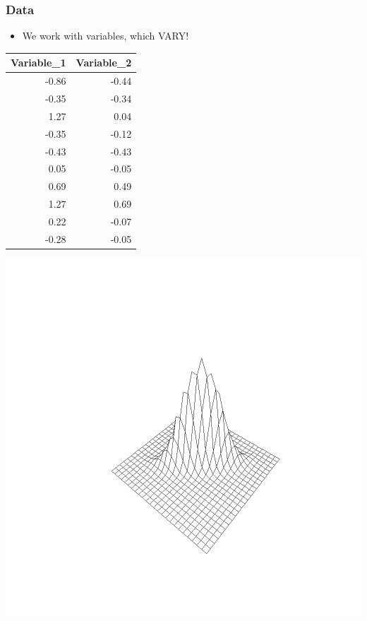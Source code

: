 \documentclass[xcolor=x11names,compress]{beamer}\usepackage[]{graphicx}\usepackage[]{color}
\makeatletter
\def\maxwidth{ %
  \ifdim\Gin@nat@width>\linewidth
    \linewidth
  \else
    \Gin@nat@width
  \fi
}
\newenvironment{knitrout}{}{} %
\renewcommand{\(}{\begin{columns}}
\renewcommand{\)}{\end{columns}}
\newcommand{\<}[1]{\begin{column}{#1}}
\renewcommand{\>}{\end{column}}
\makeatother
\begin{document}
\begin{frame}
\frametitle{Data}
\begin{itemize}
\item We work with variables, which VARY!
\end{itemize}
\begin{multicols}{2}
\begin{table}[ht]
\centering
\begin{tabular}{rr}
  \hline
Variable\_1 & Variable\_2 \\ 
  \hline
-0.86 & -0.44 \\ 
  -0.35 & -0.34 \\ 
  1.27 & 0.04 \\ 
  -0.35 & -0.12 \\ 
  -0.43 & -0.43 \\ 
  0.05 & -0.05 \\ 
  0.69 & 0.49 \\ 
  1.27 & 0.69 \\ 
  0.22 & -0.07 \\ 
  -0.28 & -0.05 \\ 
   \hline
\end{tabular}
\end{table}

\columnbreak
\begin{knitrout}
\color{fgcolor}
\includegraphics[width=\maxwidth]{figure/var6-1} 

\end{knitrout}
\end{multicols}
\end{frame}
\end{document}
